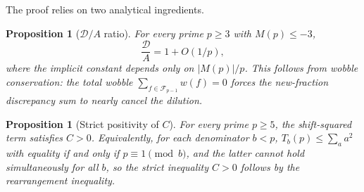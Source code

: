 \documentclass[11pt]{article}
\newtheorem{proposition}[theorem]{Proposition}
\theoremstyle{definition}
\newcommand{\F}{\mathcal{F}}
\begin{document}
The proof relies on two analytical ingredients.

\begin{proposition}[$\mathcal{D}/A$ ratio]\label{prop:DA-ratio}
For every prime $p \ge 3$ with $M(p) \le -3$,
\[
  \frac{\mathcal{D}}{A} = 1 + O(1/p),
\]
where the implicit constant depends only on $|M(p)|/p$.
This follows from wobble conservation: the total wobble
$\sum_{f \in \F_{p-1}} w(f) = 0$ forces the new-fraction
discrepancy sum to nearly cancel the dilution.
\end{proposition}

\begin{proposition}[Strict positivity of $C$]\label{prop:strict-pos}
For every prime $p \ge 5$, the shift-squared term satisfies $C > 0$.
Equivalently, for each denominator $b < p$,
$T_b(p) \le \sum_{a} a^2$ with equality if and only if
$p \equiv 1 \pmod{b}$, and the latter cannot hold simultaneously
for all $b$, so the strict inequality $C > 0$ follows by the
rearrangement inequality.
\end{proposition}
\end{document}
